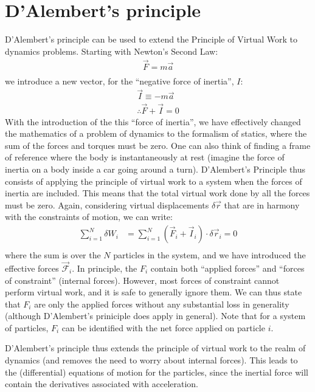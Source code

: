 \section{D'Alembert's principle}
D'Alembert's principle can be used to extend the Principle of Virtual Work to dynamics problems. Starting with Newton's Second Law:
\begin{align}
\vec{F}=m\vec{a}\nonumber\\
\end{align}
we introduce a new vector, for the ``negative force of inertia'', $I$:
\begin{align}
\vec{I}\equiv-m\vec{a}\nonumber\\
\therefore \vec{F}+\vec{I}=0
\end{align}
With the introduction of the this ``force of inertia'', we have effectively changed the mathematics of a problem of dynamics to the formalism of statics, where the sum of the forces and torques must be zero. One can also think of finding a frame of reference where the body is instantaneously at rest (imagine the force of inertia on a body inside a car going around a turn). D'Alembert's Principle thus consists of applying the principle of virtual work to a system when the forces of inertia are included. This means that the total virtual work done by all the forces must be zero. Again, considering virtual displacements $\delta\vec{r}$ that are in harmony with the constraints of motion, we can write:
\begin{align}
\sum_{i=1}^N\delta W_i&= \sum_{i=1}^N (\vec{F}_i+\vec{I}_i)\cdot\delta\vec{r}_i=0\nonumber\\
\label{eqn:dalemb1}
\end{align}
where the sum is over the $N$ particles in the system, and we have introduced the effective forces $\vec{\mathcal{F}}_i$. In principle, the $F_i$ contain both ``applied forces'' and ``forces of constraint'' (internal forces). However, most forces of constraint cannot perform virtual work, and it is safe to generally ignore them. We can thus state that $F_i$ are only the applied forces without any substantial loss in generality (although D'Alembert's priniciple does apply in general). Note that for a system of particles, $F_i$ can be identified with the net force applied on particle $i$.

D'Alembert's principle thus extends the principle of virtual work to the realm of dynamics (and removes the need to worry about internal forces). This leads to the (differential) equations of motion  for the particles, since the inertial force will contain the derivatives associated with acceleration.

